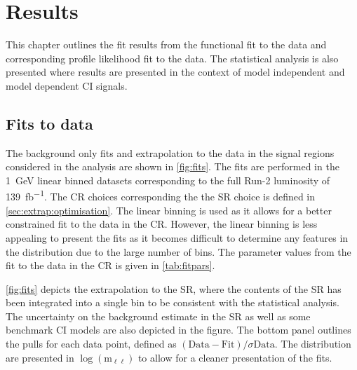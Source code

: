 \chapter{Results}\label{chap:results}
This chapter outlines the fit results from the functional fit to the data and corresponding profile likelihood fit to the data. The statistical analysis is also presented where results are presented in the context of model independent and model dependent CI signals. 

\section{Fits to data}
The background only fits and extrapolation to the data in the signal regions considered in the analysis are shown in \cref{fig:fits}. The fits are performed in the \SI{1}{\giga\electronvolt} linear binned datasets corresponding to the full Run-2 luminosity of \SI{139}{\femto\barn^{-1}}. The CR choices corresponding the the SR choice is defined in \cref{sec:extrap:optimisation}. The linear binning is used as it allows for a better constrained fit to the data in the CR. However, the linear binning is less appealing to present the fits as it becomes difficult to determine any features in the distribution due to the large number of bins. The parameter values from the fit to the data in the CR is given in \cref{tab:fitpars}. 

\cref{fig:fits} depicts the extrapolation to the SR, where the contents of the SR has been integrated into a single bin to be consistent with the statistical analysis. The uncertainty on the background estimate in the SR as well as some benchmark CI models are also depicted in the figure. The bottom panel outlines the pulls for each data point, defined as $(\mathrm{Data}-\mathrm{Fit})/\sigma\mathrm{Data}$. The distribution are presented in $\log{(\text{m}_{\ell\ell})}$ to allow for a cleaner presentation of the fits. 

